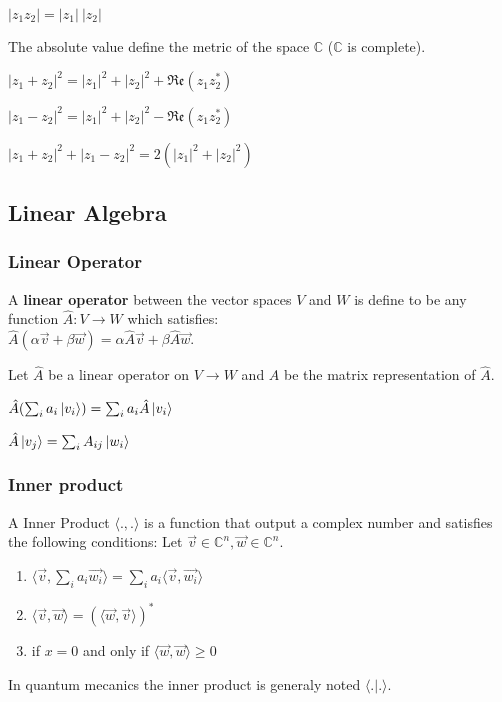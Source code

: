 \documentclass[5pt]{article}
\begin{document}
\begin{multicols}{3}
\begin{properties}
     \begin{itemize*}
          \item $|z_1z_2|=|z_1|\:|z_2|$
          \item The absolute value define the metric of the space $\mathbb{C}$ ($\mathbb{C}$ is complete).
          \item $|z_1+z_2|^2=|z_1|^2+|z_2|^2+\mathfrak{Re}(z_1z_2^*)$
          \item $|z_1-z_2|^2=|z_1|^2+|z_2|^2-\mathfrak{Re}(z_1z_2^*)$
          \item $|z_1+z_2|^2+|z_1-z_2|^2=2(|z_1|^2+|z_2|^2)$
     \end{itemize*}
\end{properties}



\subsection{Linear Algebra}

\subsubsection{Linear Operator}
A \textbf{linear operator} between the vector spaces $V$ and $W$ is define to be any function $\hat{A}:V\rightarrow W$ which satisfies:\\ $\hat{A}(\alpha\vec{v}+\beta\vec{w})=\alpha\hat{A}\vec{v}+\beta\hat{A}\vec{w}$.

\begin{properties}
     Let $\hat{A}$ be a linear operator on $V\rightarrow W$  and $A$ be the matrix representation of $\hat{A}$.
     \begin{itemize*}
          \item $\hat{A}(\sum_ia_i\ket{v_i})=\sum_ia_i\hat{A}\ket{v_i}$\\
          \item $\hat{A}\ket{v_j}=\sum_iA_{ij}\ket{w_i}$\\
     \end{itemize*}
\end{properties}


\subsubsection{Inner product}
A Inner Product $\langle.,.\rangle$ is a function that output a complex number and satisfies the following conditions: Let $\vec{v}\in\mathbb{C}^n, \vec{w}\in\mathbb{C}^n$.
\begin{enumerate}
     \item $\langle \vec{v},\sum_ia_i\vec{w_i}\rangle=\sum_ia_i\langle \vec{v},\vec{w_i}\rangle$
     \item $\langle \vec{v},\vec{w}\rangle=(\langle \vec{w},\vec{v}\rangle)^*$
     \item if $x=0$ and only if $\langle \vec{w},\vec{w}\rangle\geq 0$
\end{enumerate}
In quantum mecanics the inner product is generaly noted $\langle.|.\rangle$.


\end{multicols}
\end{document}

